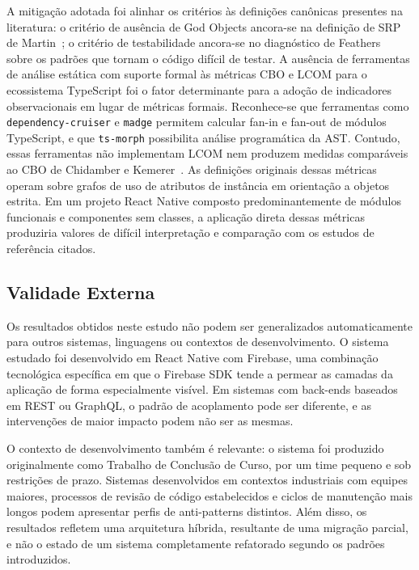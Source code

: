 \documentclass[sigconf,anonymous]{acmart}
\begin{document}
A mitigação adotada foi alinhar os critérios às definições canônicas presentes na literatura: o critério de ausência de God Objects ancora-se na definição de SRP de Martin~\cite{Martin2017}; o critério de testabilidade ancora-se no diagnóstico de Feathers~\cite{Feathers2004} sobre os padrões que tornam o código difícil de testar. A ausência de ferramentas de análise estática com suporte formal às métricas CBO e LCOM para o ecossistema TypeScript foi o fator determinante para a adoção de indicadores observacionais em lugar de métricas formais. Reconhece-se que ferramentas como \texttt{dependency-cruiser} e \texttt{madge} permitem calcular fan-in e fan-out de módulos TypeScript, e que \texttt{ts-morph} possibilita análise programática da AST. Contudo, essas ferramentas não implementam LCOM nem produzem medidas comparáveis ao CBO de Chidamber e Kemerer~\cite{Chidamber1994}. As definições originais dessas métricas operam sobre grafos de uso de atributos de instância em orientação a objetos estrita. Em um projeto React Native composto predominantemente de módulos funcionais e componentes sem classes, a aplicação direta dessas métricas produziria valores de difícil interpretação e comparação com os estudos de referência citados.

\subsection{Validade Externa}

Os resultados obtidos neste estudo não podem ser generalizados automaticamente para outros sistemas, linguagens ou contextos de desenvolvimento. O sistema estudado foi desenvolvido em React Native com Firebase, uma combinação tecnológica específica em que o Firebase SDK tende a permear as camadas da aplicação de forma especialmente visível. Em sistemas com back-ends baseados em REST ou GraphQL, o padrão de acoplamento pode ser diferente, e as intervenções de maior impacto podem não ser as mesmas.

O contexto de desenvolvimento também é relevante: o sistema foi produzido originalmente como Trabalho de Conclusão de Curso, por um time pequeno e sob restrições de prazo. Sistemas desenvolvidos em contextos industriais com equipes maiores, processos de revisão de código estabelecidos e ciclos de manutenção mais longos podem apresentar perfis de anti-patterns distintos. Além disso, os resultados refletem uma arquitetura híbrida, resultante de uma migração parcial, e não o estado de um sistema completamente refatorado segundo os padrões introduzidos.
\end{document}
